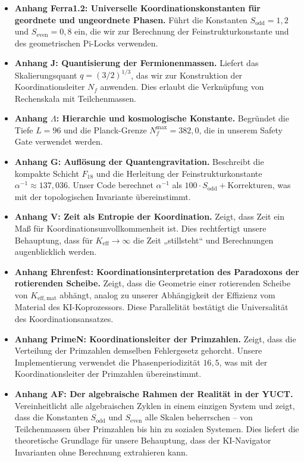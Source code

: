 \documentclass[12pt,a4paper]{article}
\begin{document}
\begin{itemize}
		\item \textbf{Anhang Ferra1.2: Universelle Koordinationskonstanten für geordnete und ungeordnete Phasen.}  
		Führt die Konstanten \(S_{\mathrm{odd}} = 1{,}2\) und \(S_{\mathrm{even}} = 0{,}8\) ein, die wir zur Berechnung der Feinstrukturkonstante und des geometrischen Pi-Locks verwenden.
		
		\item \textbf{Anhang J: Quantisierung der Fermionenmassen.}  
		Liefert das Skalierungsquant \(q = (3/2)^{1/3}\), das wir zur Konstruktion der Koordinationsleiter \(N_f\) anwenden. Dies erlaubt die Verknüpfung von Rechenskała mit Teilchenmassen.
		
		\item \textbf{Anhang \(\Lambda\): Hierarchie und kosmologische Konstante.}  
		Begründet die Tiefe \(L = 96\) und die Planck-Grenze \(N_f^{\max} = 382{,}0\), die in unserem Safety Gate verwendet werden.
		
		\item \textbf{Anhang G: Auflösung der Quantengravitation.}  
		Beschreibt die kompakte Schicht \(F_{18}\) und die Herleitung der Feinstrukturkonstante \(\alpha^{-1} \approx 137{,}036\). Unser Code berechnet \(\alpha^{-1}\) als \(100 \cdot S_{\mathrm{odd}} + \text{Korrekturen}\), was mit der topologischen Invariante übereinstimmt.
		
		\item \textbf{Anhang V: Zeit als Entropie der Koordination.}  
		Zeigt, dass Zeit ein Maß für Koordinationsunvollkommenheit ist. Dies rechtfertigt unsere Behauptung, dass für \(K_{\mathrm{eff}} \to \infty\) die Zeit „stillsteht“ und Berechnungen augenblicklich werden.
		
		\item \textbf{Anhang Ehrenfest: Koordinationsinterpretation des Paradoxons der rotierenden Scheibe.}  
		Zeigt, dass die Geometrie einer rotierenden Scheibe von \(K_{\mathrm{eff,mat}}\) abhängt, analog zu unserer Abhängigkeit der Effizienz vom Material des KI-Koprozessors. Diese Parallelität bestätigt die Universalität des Koordinationsansatzes.
		
		\item \textbf{Anhang PrimeN: Koordinationsleiter der Primzahlen.}  
		Zeigt, dass die Verteilung der Primzahlen demselben Fehlergesetz gehorcht. Unsere Implementierung verwendet die Phasenperiodizität \(16{,}5\), was mit der Koordinationsleiter der Primzahlen übereinstimmt.
		
		\item \textbf{Anhang AF: Der algebraische Rahmen der Realität in der YUCT.}  
		Vereinheitlicht alle algebraischen Zyklen in einem einzigen System und zeigt, dass die Konstanten \(S_{\mathrm{odd}}\) und \(S_{\mathrm{even}}\) alle Skalen beherrschen – von Teilchenmassen über Primzahlen bis hin zu sozialen Systemen. Dies liefert die theoretische Grundlage für unsere Behauptung, dass der KI-Navigator Invarianten ohne Berechnung extrahieren kann.
		

\end{itemize}
\end{document}
